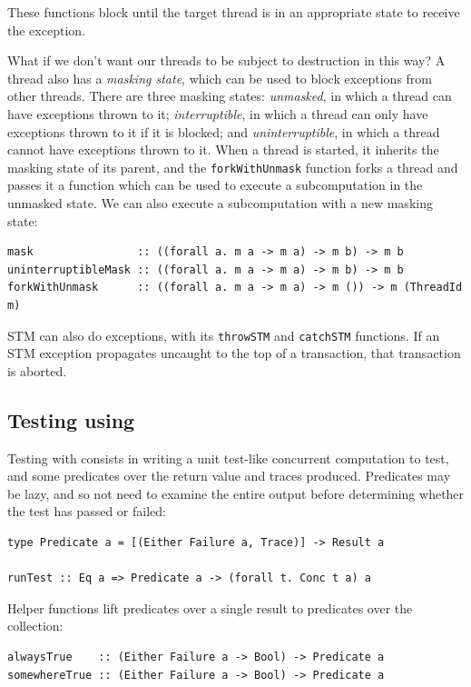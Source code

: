 These functions block until the target thread is in an appropriate
state to receive the exception.

What if we don't want our threads to be subject to destruction in this
way? A thread also has a \textit{masking state}, which can be used to
block exceptions from other threads. There are three masking states:
\textit{unmasked}, in which a thread can have exceptions thrown to it;
\textit{interruptible}, in which a thread can only have exceptions
thrown to it if it is blocked; and \textit{uninterruptible}, in which
a thread cannot have exceptions thrown to it. When a thread is
started, it inherits the masking state of its parent, and the
\texttt{forkWithUnmask} function forks a thread and passes it a
function which can be used to execute a subcomputation in the unmasked
state. We can also execute a subcomputation with a new masking state:

\begin{verbatim}
mask                :: ((forall a. m a -> m a) -> m b) -> m b
uninterruptibleMask :: ((forall a. m a -> m a) -> m b) -> m b
forkWithUnmask      :: ((forall a. m a -> m a) -> m ()) -> m (ThreadId m)
\end{verbatim}

STM can also do exceptions, with its \texttt{throwSTM} and
\texttt{catchSTM} functions. If an STM exception propagates uncaught
to the top of a transaction, that transaction is aborted.

\subsection{Testing using \dejafu{}}
\label{sec:prelims-dejafu-testing}

Testing with \dejafu{} consists in writing a unit test-like concurrent
computation to test, and some predicates over the return value and
traces produced. Predicates may be lazy, and so not need to examine
the entire output before determining whether the test has passed or
failed:

\begin{verbatim}
type Predicate a = [(Either Failure a, Trace)] -> Result a

runTest :: Eq a => Predicate a -> (forall t. Conc t a) a
\end{verbatim}

Helper functions lift predicates over a single result to predicates
over the collection:

\begin{verbatim}
alwaysTrue    :: (Either Failure a -> Bool) -> Predicate a
somewhereTrue :: (Either Failure a -> Bool) -> Predicate a
\end{verbatim}

